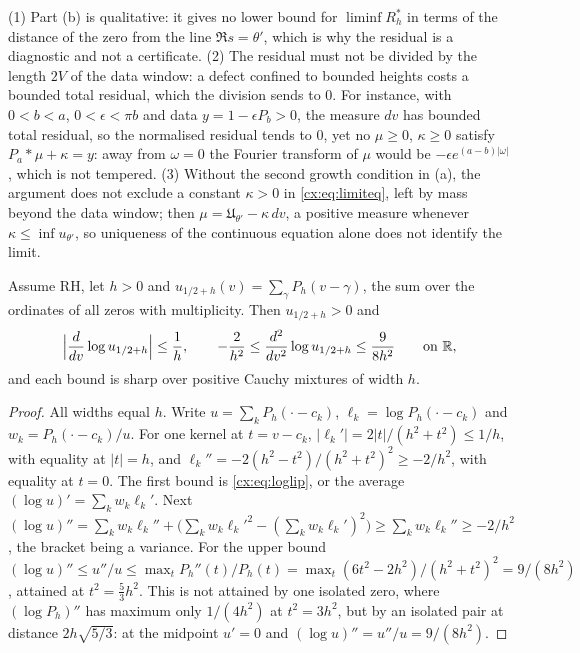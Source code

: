 \begin{remark}
(1) Part (b) is qualitative: it gives no lower bound for $\liminf R_h^*$ in terms of the distance of the zero from the line $\Re s=\theta'$, which is why the residual is a diagnostic and not a certificate. (2) The residual must not be divided by the length $2V$ of the data window: a defect confined to bounded heights costs a bounded total residual, which the division sends to $0$. For instance, with $0<b<a$, $0<\epsilon<\pi b$ and data $y=1-\epsilon P_b>0$, the measure $dv$ has bounded total residual, so the normalised residual tends to $0$, yet no $\mu\ge0$, $\kappa\ge0$ satisfy $P_a*\mu+\kappa=y$: away from $\omega=0$ the Fourier transform of $\mu$ would be $-\epsilon e^{(a-b)|\omega|}$, which is not tempered. (3) Without the second growth condition in (a), the argument does not exclude a constant $\kappa>0$ in \eqref{cx:eq:limiteq}, left by mass beyond the data window; then $\mu=\mathfrak U_{\theta'}-\kappa\,dv$, a positive measure whenever $\kappa\le\inf u_{\theta'}$, so uniqueness of the continuous equation alone does not identify the limit.
\end{remark}

\begin{proposition}\label{cx:prop:curv}
Assume RH, let $h>0$ and $u_{1/2+h}(v)=\sum_\gamma P_h(v-\gamma)$, the sum over the ordinates of all zeros with multiplicity. Then $u_{1/2+h}>0$ and
\[
\Bigl|\frac{d}{dv}\log u_{1/2+h}\Bigr|\le\frac1h,\qquad-\frac2{h^2}\le\frac{d^2}{dv^2}\log u_{1/2+h}\le\frac9{8h^2}\qquad\text{on }\mathbb{R},
\]
and each bound is sharp over positive Cauchy mixtures of width $h$.
\end{proposition}

\begin{proof}
All widths equal $h$. Write $u=\sum_kP_h(\cdot-c_k)$, $\ell_k=\log P_h(\cdot-c_k)$ and $w_k=P_h(\cdot-c_k)/u$. For one kernel at $t=v-c_k$, $|\ell_k'|=2|t|/(h^2+t^2)\le1/h$, with equality at $|t|=h$, and $\ell_k''=-2(h^2-t^2)/(h^2+t^2)^2\ge-2/h^2$, with equality at $t=0$. The first bound is \eqref{cx:eq:loglip}, or the average $(\log u)'=\sum_kw_k\ell_k'$. Next $(\log u)''=\sum_kw_k\ell_k''+\bigl(\sum_kw_k\ell_k'^2-(\sum_kw_k\ell_k')^2\bigr)\ge\sum_kw_k\ell_k''\ge-2/h^2$, the bracket being a variance. For the upper bound $(\log u)''\le u''/u\le\max_tP_h''(t)/P_h(t)=\max_t(6t^2-2h^2)/(h^2+t^2)^2=9/(8h^2)$, attained at $t^2=\tfrac53h^2$. This is not attained by one isolated zero, where $(\log P_h)''$ has maximum only $1/(4h^2)$ at $t^2=3h^2$, but by an isolated pair at distance $2h\sqrt{5/3}$: at the midpoint $u'=0$ and $(\log u)''=u''/u=9/(8h^2)$.
\end{proof}

